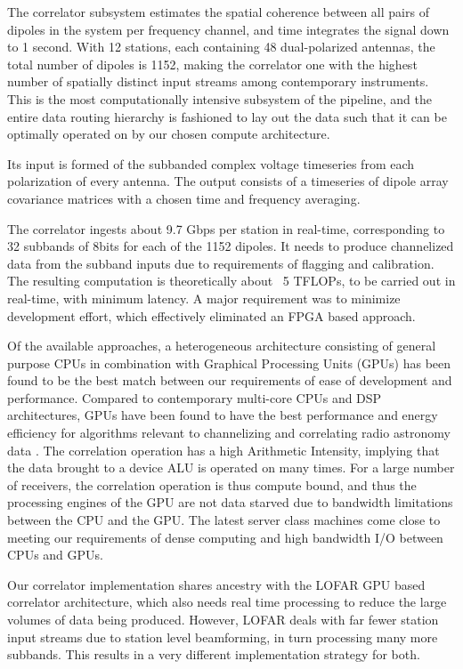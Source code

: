 \documentclass{ws-jai}
\begin{document}
The correlator  subsystem estimates the  spatial coherence between all  pairs of
dipoles in the system per frequency channel, and time integrates the signal down
to 1 second.  With 12 stations, each containing 48  dual-polarized antennas, the
total number  of dipoles  is 1152,  making the correlator  one with  the highest
number of spatially distinct input streams among contemporary instruments.  This
is the most computationally intensive subsystem  of the pipeline, and the entire
data routing  hierarchy is fashioned  to lay  out the data  such that it  can be
optimally operated on by our chosen compute architecture.

Its  input is  formed  of the  subbanded complex  voltage  timeseries from  each
polarization of  every antenna.  The output  consists of a timeseries  of dipole
array covariance matrices with a chosen time and frequency averaging.

The correlator ingests about 9.7 Gbps per station in real-time, corresponding to
32  subbands of  8bits  for each  of  the  1152 dipoles.   It  needs to  produce
channelized data  from the subband  inputs due  to requirements of  flagging and
calibration. The resulting  computation is theoretically about ~5  TFLOPs, to be
carried out  in real-time,  with minimum  latency.  A  major requirement  was to
minimize  development  effort,  which   effectively  eliminated  an  FPGA  based
approach.

Of the available  approaches, a heterogeneous architecture  consisting of general
purpose  CPUs in  combination with  Graphical Processing  Units (GPUs)  has been
found to be the  best match between our requirements of  ease of development and
performance.  Compared  to contemporary  multi-core CPUs and  DSP architectures,
GPUs have  been found  to have  the best performance  and energy  efficiency for
algorithms  relevant  to  channelizing  and  correlating  radio  astronomy  data
\cite{romein2016comparison}.  The  correlation operation  has a  high Arithmetic
Intensity, implying that  the data brought to  a device ALU is  operated on many
times.   For a  large number  of receivers,  the correlation  operation is  thus
compute bound, and thus  the processing engines of the GPU  are not data starved
due to  bandwidth limitations between  the CPU and  the GPU.  The  latest server
class machines  come close to  meeting our  requirements of dense  computing and
high bandwidth I/O between CPUs and GPUs.

Our  correlator  implementation  shares  ancestry   with  the  LOFAR  GPU  based
correlator architecture,  which also  needs real time  processing to  reduce the
large  volumes of  data being  produced.  However,  LOFAR deals  with far  fewer
station input streams due to station  level beamforming, in turn processing many
more  subbands. This  results in  a very  different implementation  strategy for
both.
\end{document}
